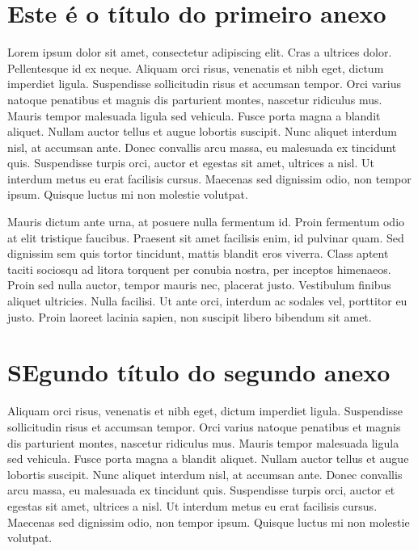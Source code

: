 


\begin{anexosenv}

\partanexos

\chapter{Este é o título do primeiro anexo}
 Lorem ipsum dolor sit amet, consectetur adipiscing elit. Cras a ultrices dolor. Pellentesque id ex neque. Aliquam orci risus, venenatis et nibh eget, dictum imperdiet ligula. Suspendisse sollicitudin risus et accumsan tempor. Orci varius natoque penatibus et magnis dis parturient montes, nascetur ridiculus mus. Mauris tempor malesuada ligula sed vehicula. Fusce porta magna a blandit aliquet. Nullam auctor tellus et augue lobortis suscipit. Nunc aliquet interdum nisl, at accumsan ante. Donec convallis arcu massa, eu malesuada ex tincidunt quis. Suspendisse turpis orci, auctor et egestas sit amet, ultrices a nisl. Ut interdum metus eu erat facilisis cursus. Maecenas sed dignissim odio, non tempor ipsum. Quisque luctus mi non molestie volutpat.

Mauris dictum ante urna, at posuere nulla fermentum id. Proin fermentum odio at elit tristique faucibus. Praesent sit amet facilisis enim, id pulvinar quam. Sed dignissim sem quis tortor tincidunt, mattis blandit eros viverra. Class aptent taciti sociosqu ad litora torquent per conubia nostra, per inceptos himenaeos. Proin sed nulla auctor, tempor mauris nec, placerat justo. Vestibulum finibus aliquet ultricies. Nulla facilisi. Ut ante orci, interdum ac sodales vel, porttitor eu justo. Proin laoreet lacinia sapien, non suscipit libero bibendum sit amet. 

\chapter{SEgundo título do segundo anexo}
Aliquam orci risus, venenatis et nibh eget, dictum imperdiet ligula. Suspendisse sollicitudin risus et accumsan tempor. Orci varius natoque penatibus et magnis dis parturient montes, nascetur ridiculus mus. Mauris tempor malesuada ligula sed vehicula. Fusce porta magna a blandit aliquet. Nullam auctor tellus et augue lobortis suscipit. Nunc aliquet interdum nisl, at accumsan ante. Donec convallis arcu massa, eu malesuada ex tincidunt quis. Suspendisse turpis orci, auctor et egestas sit amet, ultrices a nisl. Ut interdum metus eu erat facilisis cursus. Maecenas sed dignissim odio, non tempor ipsum. Quisque luctus mi non molestie volutpat.


\end{anexosenv}
